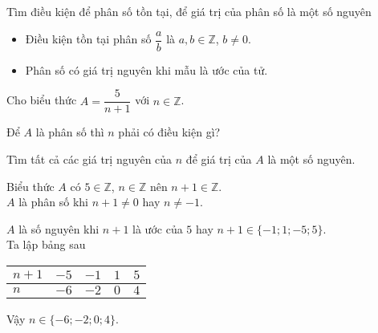 \begin{dang}{Tìm điều kiện để phân số tồn tại, để giá trị của phân số là một số nguyên}
 \begin{itemize}
  \item Điều kiện tồn tại phân số $\dfrac{a}{b}$ là $a,b\in\mathbb{Z}$, $b\neq 0$.
  \item Phân số có giá trị nguyên khi mẫu là ước của tử.
 \end{itemize}
\end{dang}

\begin{vd}%
 Cho biểu thức $A=\dfrac{5}{n+1}$ với $n\in\mathbb{Z}$.
 \begin{enumEX}{1}
  \item Để $A$ là phân số thì $n$ phải có điều kiện gì?
  \item Tìm tất cả các giá trị nguyên của $n$ để giá trị của $A$ là một số nguyên.
 \end{enumEX}
 \loigiai
  {
  \begin{enumEX}{1}
   \item Biểu thức $A$ có $5\in\mathbb{Z}$, $n\in \mathbb{Z}$ nên $n+1 \in\mathbb{Z}$.\\
   $A$ là phân số khi $n+1\neq 0$ hay $n\neq -1$.
   \item $A$ là số nguyên khi $n+1$ là ước của $5$ hay $n+1 \in \{-1;1;-5;5\}$.\\
   Ta lập bảng sau
   \begin{center}
   \begin{tabular}{|>{\centering\arraybackslash}m{1.5cm}|>{\centering\arraybackslash}m{1.5cm}|>{\centering\arraybackslash}m{1.5cm}|>{\centering\arraybackslash}m{1.5cm}|>{\centering\arraybackslash}m{1.5cm}|}
   	\hline
   	$n+1$ & $-5$ & $-1$ & $1$ & $5$ \\ \hline
    $n$ & $-6$ & $-2$ & $0$ & $4$\\ \hline
   \end{tabular}
   \end{center}
   Vậy $n\in\{-6;-2;0;4\}$.
  \end{enumEX}
  }
\end{vd}

